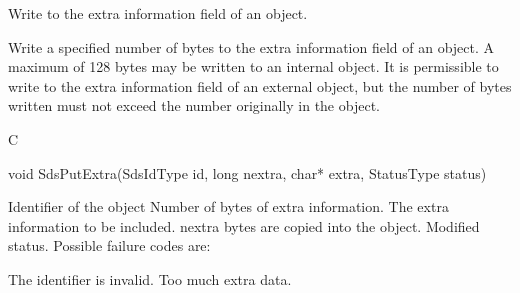 \begin{manroutinedescription}
      Write to the extra information field of an object.

      Write a specified number of bytes to the extra information field
      of an object. A maximum of 128 bytes may be written to an internal
      object. It is permissible to write to the extra information field
      of an external object, but the number of bytes written must not
      exceed the number originally in the object.

      C

      void SdsPutExtra(SdsIdType id, long nextra, char* extra,
                    StatusType {\mantt{*}} {} status)

\begin{manparametertable}
 Identifier of the object
  Number of bytes of extra %
information.
 The extra information to be %
included.
                            nextra bytes are copied into the object.
 Modified status. Possible %
failure codes are:
\end{manparametertable}
\begin{mantwocolumntable}
The identifier is invalid.
Too much extra data.
\end{mantwocolumntable}
\end{manroutinedescription}
